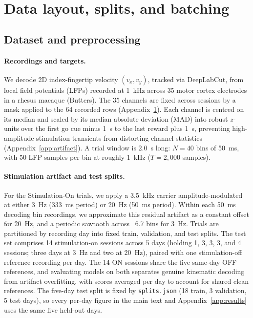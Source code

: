 \documentclass{article}
\begin{document}
\appendix
\section{Data layout, splits, and batching}\label{app:data}

\subsection{Dataset and preprocessing}\label{sec:data}
\paragraph{Recordings and targets.} 
We decode 2D index-fingertip velocity $(v_x, v_y)$, tracked via DeepLabCut, from local field potentials (LFPs) recorded at 1~kHz across 35 motor cortex electrodes in a rhesus macaque (Butters). The 35 channels are fixed across sessions by a mask applied to the 64 recorded rows (Appendix~\ref{app:data}). Each channel is centred on its median and scaled by its median absolute deviation (MAD) into robust $z$-units over the first go cue minus 1~s to the last reward plus 1~s, preventing high-amplitude stimulation transients from distorting channel statistics (Appendix~\ref{app:artifact}). A trial window is 2.0~s long: $N=40$ bins of 50~ms, with 50 LFP samples per bin at roughly 1~kHz ($T=2{,}000$ samples).

\paragraph{Stimulation artifact and test splits.} 
For the Stimulation-On trials, we apply a 3.5~kHz carrier amplitude-modulated at either 3~Hz (333~ms period) or 20~Hz (50~ms period). Within each 50~ms decoding bin recordings, we approximate this residual artifact as a constant offset for 20~Hz, and a periodic sawtooth across ~6.7 bins for 3~Hz. Trials are partitioned by recording day into fixed train, validation, and test splits. The test set comprises 14 stimulation-on sessions across 5 days (holding 1, 3, 3, 3, and 4 sessions; three days at 3~Hz and two at 20~Hz), paired with one stimulation-off reference recording per day. The 14 ON sessions share the five same-day OFF references, and evaluating models on both separates genuine kinematic decoding from artifact overfitting, with scores averaged per day to account for shared clean references. The five-day test split is fixed by \texttt{splits.json} (18 train, 3 validation, 5 test days), so every per-day figure in the main text and Appendix~\ref{app:results} uses the same five held-out days.
\end{document}
